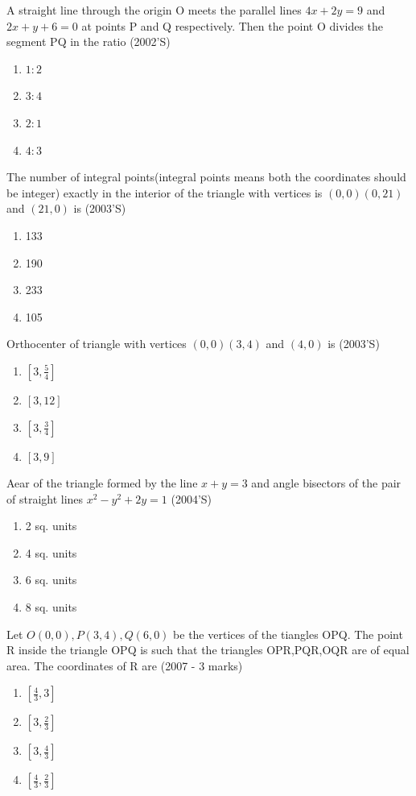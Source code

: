 \documentclass[12pt]{article}
\begin{document}
\item A straight line through the origin O meets the parallel lines $4x+2y=9$ and $2x+y+6=0$ at points P and Q respectively. Then the point O divides the segment PQ in the ratio (2002'S)
\begin{enumerate}
\item $1:2$   
\item $3:4$
\item $2:1$ 
\item $4:3$ 
\end{enumerate}
\item The number of integral points(integral points means both the coordinates should be integer) exactly in the interior of the triangle with vertices is $(0,0)(0,21)$ and     $(21,0)$ is (2003'S)
\begin{enumerate}
\item 133  
\item 190  
\item 233 
\item 105
\end{enumerate}
\item Orthocenter of triangle with vertices $(0,0)(3,4)$ and $(4,0)$ is  (2003'S)
\begin{enumerate}
\item $[3,\frac{5}{4}]$ 
\item $[3,12]$   
\item $[3,\frac{3}{4}]$ 
\item $[3,9]$
\end{enumerate}
\item Aear of the triangle formed by the line $x+y=3$ and angle bisectors of the pair of straight lines $x^2-y^2+2y=1$ (2004'S)
\begin{enumerate}
\item 2 sq. units  
\item 4 sq. units 
\item 6 sq. units    
\item 8 sq. units
\end{enumerate}
\item Let $O(0,0),P(3,4),Q(6,0)$ be the vertices of the tiangles OPQ. The point R inside the triangle OPQ is such that the triangles OPR,PQR,OQR are of equal area. The coordinates of R are (2007 - 3 marks)
\begin{enumerate}
\item $[\frac{4}{3}, 3]$   
\item $[3,\frac{2}{3}]$  
\item $[3,\frac{4}{3}]$  
\item $[\frac{4}{3},\frac{2}{3}]$
\end{enumerate}
\end{document}
